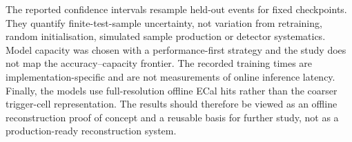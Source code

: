 The reported confidence intervals resample held-out events for fixed
checkpoints. They quantify finite-test-sample uncertainty, not variation from
retraining, random initialisation, simulated sample production or detector
systematics. Model capacity was chosen with a performance-first strategy and
the study does not map the accuracy--capacity frontier. The recorded training
times are implementation-specific and are not measurements of online
inference latency. Finally, the models use full-resolution offline ECal hits
rather than the coarser trigger-cell representation. The results should
therefore be viewed as an offline reconstruction proof of concept and a
reusable basis for further study, not as a production-ready reconstruction
system.